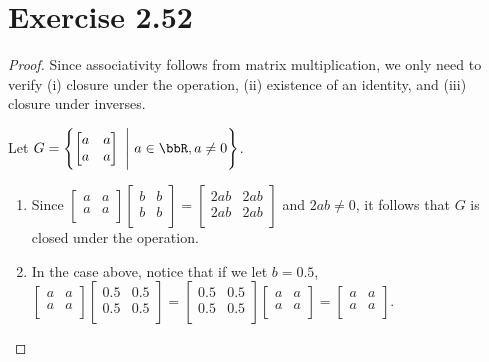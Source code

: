 \documentclass{article}
\begin{document}
\section*{Exercise 2.52}
\begin{proof}
    Since associativity follows from matrix multiplication, we only need to verify (i) closure under the operation, (ii) existence of an identity, and (iii) closure under inverses.

    Let \(G=\left\{\begin{bmatrix}
        a & a \\
        a & a
    \end{bmatrix}\ \Bigg{\vert}\ a\in\bbR, a\neq 0\right\}\).

    \begin{enumerate}[label=(\roman*)]
        \item Since \(
            \begin{bmatrix}
                a & a \\
                a & a \\
            \end{bmatrix}
            \begin{bmatrix}
                b & b \\
                b & b \\
            \end{bmatrix} =
            \begin{bmatrix}
                2ab & 2ab \\
                2ab & 2ab \\
            \end{bmatrix}\)
            and \(2ab\neq 0\), it follows that \(G\) is closed under the operation.
        \item In the case above, notice that if we let \(b=0.5\), \(
            \begin{bmatrix}
                a & a \\
                a & a \\
            \end{bmatrix}
            \begin{bmatrix}
                0.5 & 0.5 \\
                0.5 & 0.5 \\
            \end{bmatrix} =
            \begin{bmatrix}
                0.5 & 0.5 \\
                0.5 & 0.5 \\
            \end{bmatrix}
            \begin{bmatrix}
                a & a \\
                a & a \\
            \end{bmatrix} =
            \begin{bmatrix}
                a & a \\
                a & a \\
            \end{bmatrix}\).


\end{enumerate}
\end{proof}
\end{document}
